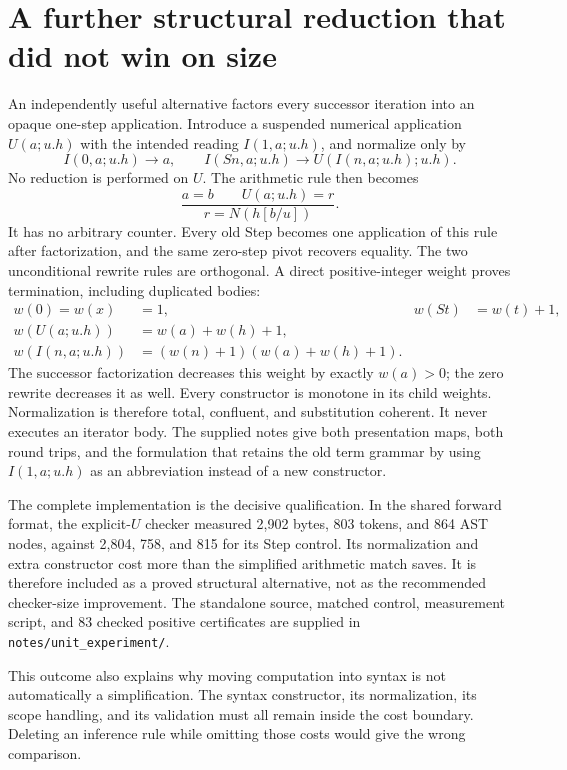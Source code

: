 \documentclass[11pt,letterpaper]{article}
\newcommand{\file}[1]{\nolinkurl{#1}}
\begin{document}
\section{A further structural reduction that did not win on size}

An independently useful alternative factors every successor iteration
into an opaque one-step application. Introduce a suspended numerical
application $U(a;u.h)$ with the intended reading $I(1,a;u.h)$, and normalize
only by
\[
 I(0,a;u.h)\longrightarrow a,
 \qquad
 I(Sn,a;u.h)\longrightarrow U(I(n,a;u.h);u.h).
\]
No reduction is performed on $U$. The arithmetic rule then becomes
\[
 \frac{a=b\qquad U(a;u.h)=r}{r=N(h[b/u])}.
\]
It has no arbitrary counter. Every old Step becomes one application of
this rule after factorization, and the same zero-step pivot recovers
equality. The two unconditional rewrite rules are orthogonal. A direct
positive-integer weight proves termination, including duplicated bodies:
\[
 \begin{aligned}
 w(0)=w(x)&=1,&w(St)&=w(t)+1,\\
 w(U(a;u.h))&=w(a)+w(h)+1,\\
 w(I(n,a;u.h))&=(w(n)+1)(w(a)+w(h)+1).
 \end{aligned}
\]
The successor factorization decreases this weight by exactly $w(a)>0$;
the zero rewrite decreases it as well. Every constructor is monotone in
its child weights. Normalization is therefore total, confluent, and
substitution coherent. It never executes an iterator body. The supplied
notes give both presentation maps, both round trips, and the formulation
that retains the old term grammar by using $I(1,a;u.h)$ as an abbreviation
instead of a new constructor.

The complete implementation is the decisive qualification. In the shared
forward format, the explicit-$U$ checker measured 2,902 bytes, 803 tokens,
and 864 AST nodes, against 2,804, 758, and 815 for its Step control.
Its normalization and extra constructor cost more than the simplified
arithmetic match saves. It is therefore included as a proved structural
alternative, not as the recommended checker-size improvement.
The standalone source, matched control, measurement script, and 83 checked
positive certificates are supplied in \file{notes/unit_experiment/}.

This outcome also explains why moving computation into syntax is not
automatically a simplification. The syntax constructor, its normalization,
its scope handling, and its validation must all remain inside the cost
boundary. Deleting an inference rule while omitting those costs would
give the wrong comparison.
\end{document}
